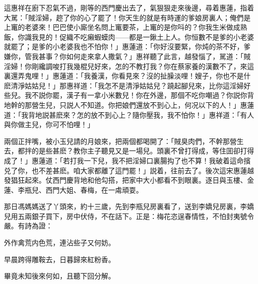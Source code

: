 這惠祥在廚下忍氣不過，剛等的西門慶出去了，氣狠狠走來後邊，尋着惠蓮，指着大駡：「賊淫婦，趂了你的心了罷了！你天生的就是有時運的爹娘房裏人；俺們是上竃的老婆來！巴巴使小廝坐名問上竃要茶，上竃的是你呌的？你我生米做成熟飯，你識我見的！促織不吃癩蝦蟆肉——都是一鍬土上人。你恒數不是爹的小老婆就罷了；是爹的小老婆我也不怕你！」惠蓮道：「你好沒要緊，你炖的茶不好，爹嫌你，管我甚事？你如何走來拿人撒氣？」惠祥聽了此言，越發惱了，駡道：「賊淫婦！你剛纔調唆打我幾棍兒好來，怎的不教打我？你在蔡家養的漢數不了，來這裏還弄鬼哩！」惠蓮道：「我養漢，你看見來？沒的扯臊淡哩！嫂子，你也不是什麽清淨姑姑兒！」那惠祥道：「我怎不是清淨姑姑兒？蹺起腳兒來，比你這淫婦好些兒。我不説你罷，漢子有一拿小米數兒！你在外邊，那個不吃你嘲過？你説你背地幹的那營生兒，只説人不知道。你把娘們還放不到心上，何况以下的人！」惠蓮道：「我背地説甚麽來？怎的放不到心上？隨你壓我，我不怕你！」惠祥道：「有人與你做主兒，你可不怕哩！」

兩個正拌嘴，被小玉兒請的月娘來，把兩個都喝開了：「賊臭肉們，不幹那營生去，都拌的是些甚麽？教你主子聽見又是一場兒。頭裏不曾打得成，等住囬卻打得成了！」惠蓮道：「若打我一下兒，我不把淫婦口裏腸抅了也不算！我破着這命擯兑了你，也不差甚麽。咱大家都離了這門罷！」説着，往前去了。後次這宋惠蓮越發猖狂起來。仗西門慶背地和他勾搭，把家中大小都看不到眼裏。逐日與玉樓、金蓮、李瓶兒、西門大姐、春梅，在一䖏頑耍。

那日馮媽媽送了丫頭來，約十三歲，先到李瓶兒房裏看了，送到李嬌兒房裏，李嬌兒用五兩銀子買下，房中伏侍，不在話下。正是：梅花恣逞春情性，不怕封夷號令嚴。有詩為證：

\begin{myquote}
外作禽荒内色荒，連沾些子又何妨。

早晨跨得雕鞍去，日暮歸來紅粉香。
\end{myquote}

畢竟未知後來何如，且聽下回分解。

